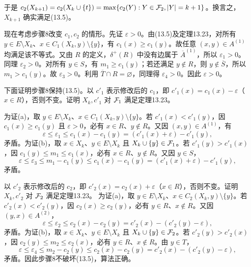 于是 $c_2(X_{k+1})=c_2(X_k\cup\{t\})=\max\{c_2(Y):Y\in\mathcal F_2,|Y|=k+1\}$。换言之，$X_{k+1}$ 确实满足(13.5)。

现在考虑步骤8改变 $c_1,c_2$ 的情形。先证 $\varepsilon>0$。由(13.5)及定理13.23，对所有 $y\in E\setminus X_k$、$x\in C_1(X_k,y)\setminus\{y\}$，有 $c_1(x)\ge c_1(y)$。故任意 $(x,y)\in A^{(1)}$ 均满足该不等式。又由 $R$ 的定义，$\delta^+(R)$ 中没有边属于 $\overline A^{(1)}$，所以 $\varepsilon_1>0$。同理 $\varepsilon_2>0$。对所有 $y\in S$，有 $m_1\ge c_1(y)$；若还满足 $y\notin R$，则 $y\notin\overline S$，所以 $m_1>c_1(y)$。故 $\varepsilon_3>0$。利用 $\overline T\cap R=\varnothing$，同理得 $\varepsilon_4>0$。因此 $\varepsilon>0$。

下面证明步骤8保持(13.5)。以 $c'_1$ 表示修改后的 $c_1$，即 $c'_1(x)=c_1(x)-\varepsilon$（$x\in R$），否则不变。证明 $X_k,c'_1$ 对 $\mathcal F_1$ 满足定理13.23。

为证(a)，取 $y\in E\setminus X_k$、$x\in C_1(X_k,y)\setminus\{y\}$。若 $c'_1(x)<c'_1(y)$，因 $c_1(x)\ge c_1(y)$ 且 $\varepsilon>0$，必有 $x\in R$、$y\notin R$。又因 $(x,y)\in A^{(1)}$，有
\[\varepsilon\le\varepsilon_1\le c_1(x)-c_1(y)=(c'_1(x)+\varepsilon)-c'_1(y),\]
矛盾。为证(b)，取 $x\in X_k$、$y\in E\setminus X_k$ 且 $X_k\cup\{y\}\in\mathcal F_1$。若 $c'_1(y)>c'_1(x)$，因 $c_1(y)\le m_1\le c_1(x)$，必有 $x\in R$、$y\notin R$。又因 $y\in S$，
\[\varepsilon\le\varepsilon_3\le m_1-c_1(y)\le c_1(x)-c_1(y)=(c'_1(x)+\varepsilon)-c'_1(y),\]
矛盾。

以 $c'_2$ 表示修改后的 $c_2$，即 $c'_2(x)=c_2(x)+\varepsilon$（$x\in R$），否则不变。证明 $X_k,c'_2$ 对 $\mathcal F_2$ 满足定理13.23。
为证(a)，取 $y\in E\setminus X_k$、$x\in C_2(X_k,y)\setminus\{y\}$。若 $c'_2(x)<c'_2(y)$，因 $c_2(x)\ge c_2(y)$，必有 $y\in R$、$x\notin R$。又因 $(y,x)\in A^{(2)}$，
\[\varepsilon\le\varepsilon_2\le c_2(x)-c_2(y)=c'_2(x)-(c'_2(y)-\varepsilon),\]
矛盾。为证(b)，取 $x\in X_k$、$y\in E\setminus X_k$ 且 $X_k\cup\{y\}\in\mathcal F_2$。若 $c'_2(y)>c'_2(x)$，因 $c_2(y)\le m_2\le c_2(x)$，必有 $y\in R$、$x\notin R$。由 $y\in T$，
\[\varepsilon\le\varepsilon_4\le m_2-c_2(y)\le c_2(x)-c_2(y)=c'_2(x)-(c'_2(y)-\varepsilon),\]
矛盾。因此步骤8不破坏(13.5)，算法正确。

